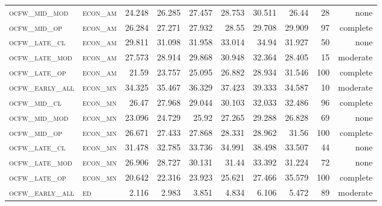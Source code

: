 \begin{landscape}
\begin{center}
\begin{footnotesize}
\begin{longtable}{llrrrrr|rrr}
\textsc{ocfw\_mid\_mod  } & \textsc{econ\_am  }    & 24.248   & 26.285   & 27.457   & 28.753   & 30.511     & 26.44         & 28            & none        \\
\textsc{ocfw\_mid\_op   } & \textsc{econ\_am  }    & 26.284   & 27.271   & 27.932   & 28.55    & 29.708     & 29.909        & 97            & complete        \\
\textsc{ocfw\_late\_cl  } & \textsc{econ\_am  }    & 29.811   & 31.098   & 31.958   & 33.014   & 34.94      & 31.927        & 50            & none        \\
\textsc{ocfw\_late\_mod } & \textsc{econ\_am  }    & 27.573   & 28.914   & 29.868   & 30.948   & 32.364     & 28.405        & 15            & moderate        \\
\textsc{ocfw\_late\_op  } & \textsc{econ\_am  }    & 21.59    & 23.757   & 25.095   & 26.882   & 28.934     & 31.546        & 100           & complete             \\
\textsc{ocfw\_early\_all} & \textsc{econ\_mn  }    & 34.325   & 35.467   & 36.329   & 37.423   & 39.333     & 34.587        & 10            & moderate        \\
\textsc{ocfw\_mid\_cl   } & \textsc{econ\_mn  }    & 26.47    & 27.968   & 29.044   & 30.103   & 32.033     & 32.486        & 96            & complete        \\
\textsc{ocfw\_mid\_mod  } & \textsc{econ\_mn  }    & 23.096   & 24.729   & 25.92    & 27.265   & 29.288     & 26.828        & 69            & none        \\
\textsc{ocfw\_mid\_op   } & \textsc{econ\_mn  }    & 26.671   & 27.433   & 27.868   & 28.331   & 28.962     & 31.56         & 100           & complete             \\
\textsc{ocfw\_late\_cl  } & \textsc{econ\_mn  }    & 31.478   & 32.785   & 33.736   & 34.991   & 38.498     & 33.507        & 44            & none        \\
\textsc{ocfw\_late\_mod } & \textsc{econ\_mn  }    & 26.906   & 28.727   & 30.131   & 31.44    & 33.392     & 31.224        & 72            & none        \\
\textsc{ocfw\_late\_op  } & \textsc{econ\_mn  }    & 20.642   & 22.316   & 23.923   & 25.621   & 27.466     & 35.579        & 100           & complete             \\
\textsc{ocfw\_early\_all} & \textsc{ed        }    & 2.116    & 2.983    & 3.851    & 4.834    & 6.106      & 5.472         & 89            & moderate        \\

\end{longtable}
\end{footnotesize}
\end{center}
\end{landscape}
